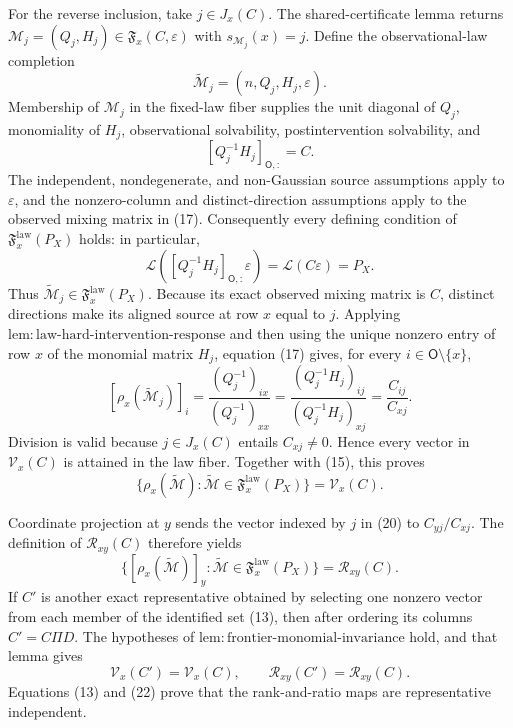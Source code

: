 For the reverse inclusion, take \(j\in J_x(C)\). The shared-certificate lemma returns \(\mathcal M_j=(Q_j,H_j)\in\mathfrak F_x(C,\varepsilon)\) with \(s_{\mathcal M_j}(x)=j\). Define the observational-law completion
\[
 \widetilde{\mathcal M}_j=(n,Q_j,H_j,\varepsilon). \tag{16}
\]
Membership of \(\mathcal M_j\) in the fixed-law fiber supplies the unit diagonal of \(Q_j\), monomiality of \(H_j\), observational solvability, postintervention solvability, and
\[
 [Q_j^{-1}H_j]_{\mathsf O,:}=C. \tag{17}
\]
The independent, nondegenerate, and non-Gaussian source assumptions apply to \(\varepsilon\), and the nonzero-column and distinct-direction assumptions apply to the observed mixing matrix in (17). Consequently every defining condition of \(\mathfrak F_x^{\mathrm{law}}(P_X)\) holds: in particular,
\[
 \mathcal L([Q_j^{-1}H_j]_{\mathsf O,:}\varepsilon)
 =\mathcal L(C\varepsilon)=P_X. \tag{18}
\]
Thus \(\widetilde{\mathcal M}_j\in\mathfrak F_x^{\mathrm{law}}(P_X)\). Because its exact observed mixing matrix is \(C\), distinct directions make its aligned source at row \(x\) equal to \(j\). Applying \(\mathrm{lem{:}law\text{-}hard\text{-}intervention\text{-}response}\) and then using the unique nonzero entry of row \(x\) of the monomial matrix \(H_j\), equation (17) gives, for every \(i\in\mathsf O\setminus\{x\}\),
\[
 [\rho_x(\widetilde{\mathcal M}_j)]_i
 =\frac{(Q_j^{-1})_{ix}}{(Q_j^{-1})_{xx}}
 =\frac{(Q_j^{-1}H_j)_{ij}}{(Q_j^{-1}H_j)_{xj}}
 =\frac{C_{ij}}{C_{xj}}. \tag{19}
\]
Division is valid because \(j\in J_x(C)\) entails \(C_{xj}\ne0\). Hence every vector in \(\mathcal V_x(C)\) is attained in the law fiber. Together with (15), this proves
\[
 \{\rho_x(\widetilde{\mathcal M}):\widetilde{\mathcal M}\in\mathfrak F_x^{\mathrm{law}}(P_X)\}
 =\mathcal V_x(C). \tag{20}
\]

Coordinate projection at \(y\) sends the vector indexed by \(j\) in (20) to \(C_{yj}/C_{xj}\). The definition of \(\mathcal R_{xy}(C)\) therefore yields
\[
 \{[\rho_x(\widetilde{\mathcal M})]_y:\widetilde{\mathcal M}\in\mathfrak F_x^{\mathrm{law}}(P_X)\}
 =\mathcal R_{xy}(C). \tag{21}
\]
If \(C'\) is another exact representative obtained by selecting one nonzero vector from each member of the identified set (13), then after ordering its columns \(C'=C\Pi D\). The hypotheses of \(\mathrm{lem{:}frontier\text{-}monomial\text{-}invariance}\) hold, and that lemma gives
\[
 \mathcal V_x(C')=\mathcal V_x(C),
 \qquad
 \mathcal R_{xy}(C')=\mathcal R_{xy}(C). \tag{22}
\]
Equations (13) and (22) prove that the rank-and-ratio maps are representative independent.


